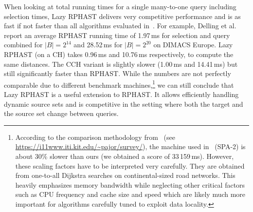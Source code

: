 \documentclass[manuscript,review]{acmart}
\begin{document}
When looking at total running times for a single many-to-one query including selection times, Lazy RPHAST delivers very competitive performance and is as fast if not faster than all algorithms evaluated in~\cite{delling_et_al:OASIcs:2011:3266}.
For example, Delling et al. report an average RPHAST running time of 1.97\,ms for selection and query combined for $|B| = 2^{14}$ and 28.52\,ms for $|B| = 2^{20}$ on DIMACS Europe.
Lazy RPHAST (on a CH) takes 0.96\,ms and 10.76\,ms respectively, to compute the same distances.
The CCH variant is slightly slower (1.00\,ms and 14.41\,ms) but still significantly faster than RPHAST.
While the numbers are not perfectly comparable due to different benchmark machines,\footnote{
According to the comparison methodology from~\cite{bdgmpsww-rptn-16} (see \url{https://i11www.iti.kit.edu/~pajor/survey/}), the machine used in~\cite{delling_et_al:OASIcs:2011:3266} (SPA-2) is about 30\% slower than ours (we obtained a score of 33\,159\,ms).
However, these scaling factors have to be interpreted very carefully.
They are obtained from one-to-all Dijkstra searches on continental-sized road networks.
This heavily emphasizes memory bandwidth while neglecting other critical factors such as CPU frequency and cache size and speed which are likely much more important for algorithms carefully tuned to exploit data locality.
} we can still conclude that Lazy RPHAST is a useful extension to RPHAST.
It allows efficiently handling dynamic source sets and is competitive in the setting where both the target and the source set change between queries.


\end{document}
